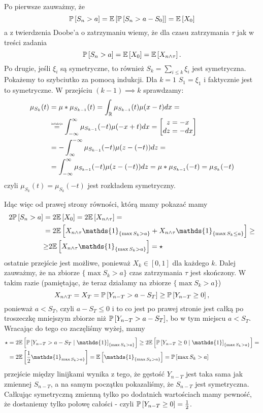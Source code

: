 \documentclass{article}
\begin{document}
Po pierwsze zauważmy, że 
$$\prob{S_n>a}=\expected{\prob{S_n>a-S_0}}=\expected{X_0}$$
a z twierdzenia Doobe'a o zatrzymaniu wiemy, że dla czasu zatrzymania $\tau$ jak w treści zadania
$$\prob{S_n>a}=\expected{X_0}=\expected{X_{n\land \tau}}.$$
Po drugie, jeśli $\xi_i$ są symetryczne, to również $S_k=\sum_{i\leq k}\xi_i$ jest symetryczna. Pokażemy to szybciutko za pomocą indukcji. Dla $k=1$ $S_1=\xi_1$ i faktycznie jest to symetryczne. W przejściu $(k-1)\implies k$ sprawdzamy:
\begin{align*}
  \mu_{S_k}(t)&=\mu\ast\mu_{S_{k-1}}(t)=\int_{\R}\mu_{S_{k-1}}(t)\mu(x-t)dx=\\ 
              &\overset{\text{\scalebox{0.55}{indukcja}}}{=}\int_{-\infty}^\infty\mu_{S_{k-1}}(-t)\mu(-x+t)dx=\begin{bmatrix}z=-x\\dz=-dx\end{bmatrix}\\ 
              &=-\int^{-\infty}_\infty\mu_{S_{k-1}}(-t)\mu(z-(-t))dz=\\
              &=\int_{-\infty}^\infty\mu_{S_{k-1}}(-t)\mu(z-(-t))dz=\mu\ast\mu_{S_{k-1}}(-t)=\mu_{S_k}(-t)
\end{align*}
czyli $\mu_{S_k}(t)=\mu_{S_k}(-t)$ jest rozkładem symetryczny.

Idąc więc od prawej strony równości, którą mamy pokazać mamy
\begin{align*}
  2\prob{S_n>a}&=2\expected{X_0}=2\expected{X_{n\land \tau}}=\\ 
               &=2\expected{X_{n\land\tau}\mathds{1}_{\{\max S_k>a\}}+X_{n\land\tau}\mathds{1}_{\{\max S_k\leq a\}}}\geq\\ 
               &{\geq}2\expected{X_{n\land\tau}\mathds{1}_{\{\max S_k>a\}}}=\star
\end{align*}
ostatnie przejście jest możliwe, ponieważ $X_k\in[0,1]$ dla każdego $k$. Dalej zauważmy, że na zbiorze $\{\max S_k>a\}$ czas zatrzymania $\tau$ jest skończony. W takim razie (pamiętając, że teraz działamy na zbiorze $\{\max S_k>a\}$) 
$$X_{n\land T}=X_T=\prob{Y_{n-T}>a-S_T}\geq\prob{Y_{n-T}\geq 0},$$
ponieważ $a<S_T$, czyli $a-S_T\leq 0$ i to co jest po prawej stronie jest całką po troszeczkę mniejszym zbiorze niż $\prob{Y_{n-T}>a-S_T}$, bo w tym miejscu $a<S_T$. Wracając do tego co zaczęliśmy wyżej, mamy 
\begin{align*}
  \star &=2\expected{\prob{Y_{n-T}>a-S_T}\mathds{1}_{\{\max S_k>a\}}}\geq 2\expected{\prob{Y_{n-T}\geq 0}\mathds{1}_{\{\max S_k>a\}}}=\\ 
        &=2\expected{\frac{1}{2}\mathds{1}_{\max S_k>a\}}}=\expected{\mathds{1}_{\{\max S_k>a\}}}=\prob{\max S_k>a}
\end{align*}
przejście między linijkami wynika z tego, że gęstość $Y_{n-T}$ jest taka sama jak zmiennej $S_{n-T}$, a na samym początku pokazaliśmy, że $S_{n-T}$ jest symetryczna. Całkując symetryczną zmienną tylko po dodatnich wartościach mamy pewność, że dostaniemy tylko połowę całości - czyli $\prob{Y_{n-T}\geq0}=\frac{1}{2}$.
\end{document}
